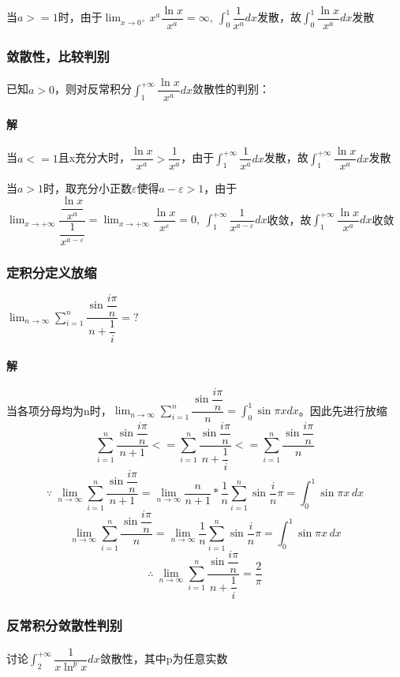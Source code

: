 当\(a >= 1\)时，由于\(\lim_{x \to 0^+}x^a\dfrac{\ln x}{x^a} = \infty,\ \int_0^1\dfrac{1}{x^a}dx\)发散，故\(\int_0^1\dfrac{\ln x}{x^a}dx\)发散


\subsubsection{敛散性，比较判别}
已知\(a > 0\)，则对反常积分\(\displaystyle\int_1^{+\infty}\dfrac{\ln x}{x^a}dx\)敛散性的判别：

\paragraph{解}
当\(a <= 1\)且x充分大时，\(\dfrac{\ln x}{x^a} > \dfrac{1}{x^a}\)，由于\(\int_1^{+\infty}\dfrac{1}{x^a}dx\)发散，故\(\int_1^{+\infty}\dfrac{\ln x}{x^a}dx\)发散

当\(a > 1\)时，取充分小正数\(\varepsilon\)使得\(a - \varepsilon > 1\)，由于\(\lim_{x \to +\infty}\dfrac{\dfrac{\ln x}{x^a}}{\dfrac{1}{x^{a - \varepsilon}}} = \lim_{x \to +\infty}\dfrac{\ln x}{x^\varepsilon} = 0,\ \int_1^{+\infty}\dfrac{1}{x^{a - \varepsilon}}dx\)收敛，故\(\int_1^{+\infty}\dfrac{\ln x}{x^a}dx\)收敛


\subsubsection{定积分定义放缩}
\(\displaystyle\lim_{n \to \infty}\sum_{i = 1}^n\dfrac{\sin\dfrac{i\pi}{n}}{n + \dfrac{1}{i}} = ?\)

\paragraph{解}
当各项分母均为n时，\(\displaystyle\lim_{n \to \infty}\sum_{i = 1}^n\dfrac{\sin\dfrac{i\pi}{n}}{n} = \int_0^1\sin\pi xdx\)。因此先进行放缩
\[\sum_{i = 1}^n\dfrac{\sin\dfrac{i\pi}{n}}{n + 1} <= \sum_{i = 1}^n\dfrac{\sin\dfrac{i\pi}{n}}{n + \dfrac{1}{i}} <= \sum_{i = 1}^n\dfrac{\sin\dfrac{i\pi}{n}}{n}\]
\[\because\ \lim_{n \to \infty}\sum_{i = 1}^n\dfrac{\sin\dfrac{i\pi}{n}}{n + 1} = \lim_{n \to \infty}\dfrac{n}{n + 1} * \dfrac{1}{n}\sum_{i = 1}^n\sin\dfrac{i}{n}\pi = \int_0^1\sin\pi x\,dx\]
\[\lim_{n \to \infty}\sum_{i = 1}^n\dfrac{\sin\dfrac{i\pi}{n}}{n} = \lim_{n \to \infty}\dfrac{1}{n}\sum_{i = 1}^n\sin\dfrac{i}{n}\pi = \int_0^1\sin\pi x\,dx\]
\[\therefore\ \lim_{n \to \infty}\sum_{i = 1}^n\dfrac{\sin\dfrac{i\pi}{n}}{n + \dfrac{1}{i}} = \dfrac{2}{\pi}\]


\subsubsection{反常积分敛散性判别}
讨论\(\displaystyle\int_2^{+\infty}\dfrac{1}{x\ln^px}dx\)敛散性，其中p为任意实数

